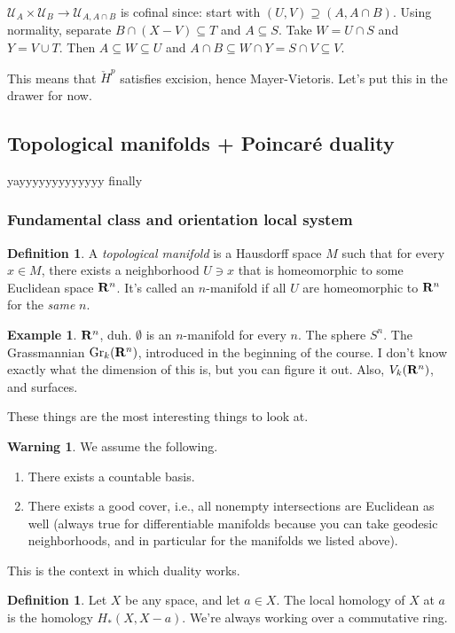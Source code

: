 \documentclass{amsart}
\theoremstyle{theorem}
\theoremstyle{definition}
\newtheorem{definition}[theorem]{Definition}
\newtheorem{example}[theorem]{Example}
\newtheorem{warning}[theorem]{Warning}
\newcommand\cHH{\check{H}}
\begin{document}
$\mathcal{U}_A\times\mathcal{U}_B\to\mathcal{U}_{A,A\cap B}$ is cofinal since: start with $(U,V)\supseteq(A,A\cap B)$. Using normality, separate $B\cap(X-V)\subseteq T$ and $A\subseteq S$. Take $W=U\cap S$ and $Y=V\cup T$. Then $A\subseteq W\subseteq U$ and $A\cap B\subseteq W\cap Y=S\cap V\subseteq V$.

This means that $\cHH^p$ satisfies excision, hence Mayer-Vietoris. Let's put this in the drawer for now.
\subsection{Topological manifolds + Poincar\'{e} duality}
yayyyyyyyyyyyyy finally
\subsubsection{Fundamental class and orientation local system}
\begin{definition}
A \emph{topological manifold} is a Hausdorff space $M$ such that for every $x\in M$, there exists a neighborhood $U\ni x$ that is homeomorphic to some Euclidean space $\mathbf R^n$. It's called an $n$-manifold if all $U$ are homeomorphic to $\mathbf R^n$ for the \emph{same} $n$.
\end{definition}
\begin{example}
$\mathbf R^n$, duh. $\emptyset$ is an $n$-manifold for every $n$. The sphere $S^n$. The Grassmannian $\mathrm{Gr}_k(\mathbf R^n)$, introduced in the beginning of the course. I don't know exactly what the dimension of this is, but you can figure it out. Also, $V_k(\mathbf R^n)$, and surfaces.
\end{example}
These things are the most interesting things to look at.
\begin{warning}
We assume the following.
\begin{enumerate}
\item There exists a countable basis.
\item There exists a good cover, i.e., all nonempty intersections are Euclidean as well (always true for differentiable manifolds because you can take geodesic neighborhoods, and in particular for the manifolds we listed above).
\end{enumerate}
\end{warning}
This is the context in which duality works.
\begin{definition}
Let $X$ be any space, and let $a\in X$. The local homology of $X$ at $a$ is the homology $H_\ast(X,X-a)$. We're always working over a commutative ring.
\end{definition}
\end{document}

